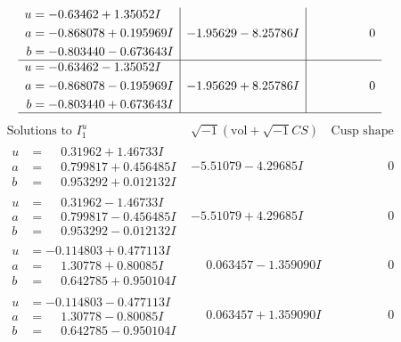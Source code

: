 \documentclass[1p]{elsarticle_modified}
\theoremstyle{definition}
\newcommand{\I}{\sqrt{-1}}
\begin{document}
$$\begin{array}{c|c|c}
\begin{aligned}
u &= -0.63462 + 1.35052 I \\
a &= -0.868078 + 0.195969 I \\
b &= -0.803440 - 0.673643 I\end{aligned}
 & -1.95629 - 8.25786 I & \phantom{-0.000000 } 0 \\ \hline\begin{aligned}
u &= -0.63462 - 1.35052 I \\
a &= -0.868078 - 0.195969 I \\
b &= -0.803440 + 0.673643 I\end{aligned}
 & -1.95629 + 8.25786 I & \phantom{-0.000000 } 0\\
 \hline 
 \end{array}$$\newpage$$\begin{array}{c|c|c}  
\text{Solutions to }I^u_{1}& \I (\text{vol} + \sqrt{-1}CS) & \text{Cusp shape}\\
 \hline 
\begin{aligned}
u &= \phantom{-}0.31962 + 1.46733 I \\
a &= \phantom{-}0.799817 + 0.456485 I \\
b &= \phantom{-}0.953292 + 0.012132 I\end{aligned}
 & -5.51079 - 4.29685 I & \phantom{-0.000000 } 0 \\ \hline\begin{aligned}
u &= \phantom{-}0.31962 - 1.46733 I \\
a &= \phantom{-}0.799817 - 0.456485 I \\
b &= \phantom{-}0.953292 - 0.012132 I\end{aligned}
 & -5.51079 + 4.29685 I & \phantom{-0.000000 } 0 \\ \hline\begin{aligned}
u &= -0.114803 + 0.477113 I \\
a &= \phantom{-}1.30778 + 0.80085 I \\
b &= \phantom{-}0.642785 + 0.950104 I\end{aligned}
 & \phantom{-}0.063457 - 1.359090 I & \phantom{-0.000000 } 0 \\ \hline\begin{aligned}
u &= -0.114803 - 0.477113 I \\
a &= \phantom{-}1.30778 - 0.80085 I \\
b &= \phantom{-}0.642785 - 0.950104 I\end{aligned}
 & \phantom{-}0.063457 + 1.359090 I & \phantom{-0.000000 } 0 \\ \hline\begin{aligned}

\end{aligned}
\end{array}$$
\end{document}
